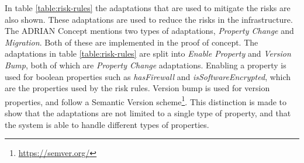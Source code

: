 In table \ref{table:risk-rules} the adaptations that are used to mitigate the risks are also shown. These adaptations are used to reduce the risks in the infrastructure. The ADRIAN Concept \cite{mann2023ADRIAN} mentions two types of adaptations, \emph{Property Change} and \emph{Migration}. Both of these are implemented in the proof of concept. The adaptations in table \ref{table:risk-rules} are split into \emph{Enable Property} and \emph{Version Bump}, both of which are \emph{Property Change} adaptations. Enabling a property is used for boolean properties such as \emph{hasFirewall} and \emph{isSoftwareEncrypted}, which are the properties used by the risk rules. Version bump is used for version properties, and follow a Semantic Version scheme\footnote{\url{https://semver.org/}}. This distinction is made to show that the adaptations are not limited to a single type of property, and that the system is able to handle different types of properties.

